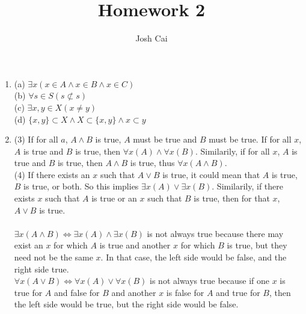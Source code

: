 \documentclass{article}
\begin{document}
\title{Homework 2}
\author{Josh Cai}

\maketitle


\begin{enumerate}
\item 
(a) $\exists x (x\in A \wedge x\in B \wedge x\in C)$ 
\\(b) $\forall s \in S(s\not\subset s)$
\\(c) $\exists x,y \in X(x \neq y)$
\\(d) $\{x,y\} \subset X \wedge X \subset \{x,y\} \wedge x \subset y$

\item
(3) If for all $a$, $A \wedge B$ is true, $A$ must be true and $B$ must be true. If for all $x$, $A$ is true and $B$ is true, then $\forall x(A)\wedge \forall x(B)$. Similarily, if for all $x$, $A$ is true and $B$ is true, then $A \wedge B$ is true, thus $\forall x(A \wedge B)$. 
\\(4) If there exists an $x$ such that $A \vee B$ is true, it could mean that $A$ is true, $B$ is true, or both. So this implies $\exists x(A) \vee \exists x(B)$. Similarily, if there exists $x$ such that $A$ is true or an $x$ such that $B$ is true, then for that $x$, $A \vee B$ is true. 
\\\\ $\exists x (A\wedge B) \Leftrightarrow \exists x(A) \wedge \exists x(B)$ is not always true because there may exist an $x$ for which $A$ is true and another $x$ for which $B$ is true, but they need not be the same $x$. In that case, the left side would be false, and the right side true.
\\ $\forall x (A\vee B) \Leftrightarrow \forall x(A) \vee \forall x(B)$ is not always true because if one $x$ is true for $A$ and false for $B$ and another $x$ is false for $A$ and true for $B$, then the left side would be true, but the right side would be false.




\end{enumerate}
\end{document}
